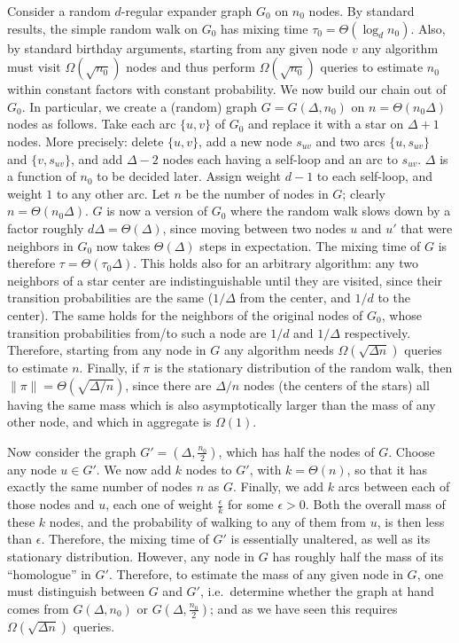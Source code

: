 \documentclass[a4paper,11pt]{article}
\begin{document}
Consider a random $d$-regular expander graph $G_0$ on $n_0$ nodes.
By standard results, the simple random walk on $G_0$ has mixing time $\tau_0 = \Theta(\log_d{n_0})$.
Also, by standard birthday arguments, starting from any given node $v$ any algorithm must visit $\Omega(\sqrt{n_0})$ nodes and thus perform $\Omega(\sqrt{n_0})$ queries to estimate $n_0$ within constant factors with constant probability.
We now build our chain out of $G_0$.
In particular, we create a (random) graph $G=G(\Delta,n_0)$ on $n = \Theta(n_0 \Delta)$ nodes as follows.
Take each arc $\{u,v\}$ of $G_0$ and replace it with a star on $\Delta+1$ nodes.
More precisely: delete $\{u,v\}$, add a new node $s_{uv}$ and two arcs $\{u,s_{uv}\}$ and $\{v,s_{uv}\}$, and add $\Delta-2$ nodes each having a self-loop and an arc to $s_{uv}$.
$\Delta$ is a function of $n_0$ to be decided later.
Assign weight $d-1$ to each self-loop, and weight $1$ to any other arc.
Let $n$ be the number of nodes in $G$; clearly $n = \Theta(n_0 \Delta)$.
$G$ is now a version of $G_0$ where the random walk slows down by a factor roughly $d\Delta = \Theta(\Delta)$, since moving between two nodes $u$ and $u'$ that were neighbors in $G_0$ now takes $\Theta(\Delta)$ steps in expectation.
The mixing time of $G$ is therefore $\tau = \Theta(\tau_0 \Delta)$.
This holds also for an arbitrary algorithm: any two neighbors of a star center are indistinguishable until they are visited, since their transition probabilities are the same ($1/\Delta$ from the center, and $1/d$ to the center).
The same holds for the neighbors of the original nodes of $G_0$, whose transition probabilities from/to such a node are $1/d$ and $1/\Delta$ respectively.
Therefore, starting from any node in $G$ any algorithm needs $\Omega(\sqrt{\Delta n})$ queries to estimate $n$.
Finally, if $\pi$ is the stationary distribution of the random walk, then $\|\pi\|= \Theta(\sqrt{\Delta/n})$, since there are $\Delta/n$ nodes (the centers of the stars) all having the same mass which is also asymptotically larger than the mass of any other node, and which in aggregate is $\Omega(1)$.

Now consider the graph $G'=(\Delta,\frac{n_0}{2})$, which has half the nodes of $G$.
Choose any node $u \in G'$.
We now add $k$ nodes to $G'$, with $k = \Theta(n)$, so that it has exactly the same number of nodes $n$ as $G$.
Finally, we add $k$ arcs between each of those nodes and $u$, each one of weight $\frac{\epsilon}{k}$ for some $\epsilon > 0$.
Both the overall mass of these $k$ nodes, and the probability of walking to any of them from $u$, is then less than $\epsilon$.
Therefore, the mixing time of $G'$ is essentially unaltered, as well as its stationary distribution.
However, any node in $G$ has roughly half the mass of its ``homologue'' in $G'$.
Therefore, to estimate the mass of any given node in $G$, one must distinguish between $G$ and $G'$, i.e.\ determine whether the graph at hand comes from $G(\Delta,n_0)$ or $G(\Delta,\frac{n_0}{2})$; and as we have seen this requires $\Omega(\sqrt{\Delta n})$ queries.
\end{document}
